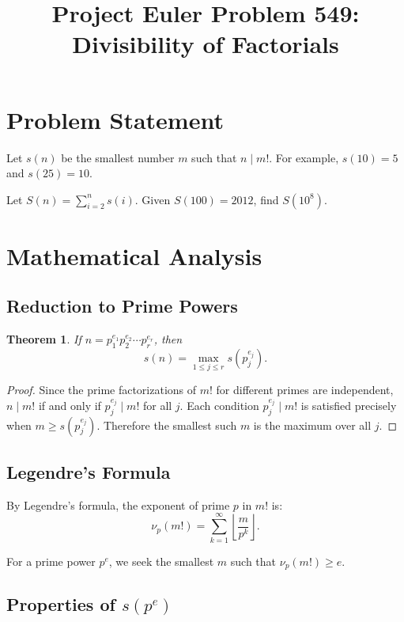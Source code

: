 \documentclass[12pt]{article}
\title{Project Euler Problem 549: Divisibility of Factorials}
\author{}
\date{}
\newtheorem{theorem}{Theorem}
\theoremstyle{definition}
\begin{document}
\maketitle

\section{Problem Statement}

Let $s(n)$ be the smallest number $m$ such that $n \mid m!$. For example, $s(10) = 5$ and $s(25) = 10$.

Let $S(n) = \sum_{i=2}^{n} s(i)$. Given $S(100) = 2012$, find $S(10^8)$.

\section{Mathematical Analysis}

\subsection{Reduction to Prime Powers}

\begin{theorem}
If $n = p_1^{e_1} p_2^{e_2} \cdots p_r^{e_r}$, then
\[
s(n) = \max_{1 \le j \le r} s(p_j^{e_j}).
\]
\end{theorem}

\begin{proof}
Since the prime factorizations of $m!$ for different primes are independent, $n \mid m!$ if and only if $p_j^{e_j} \mid m!$ for all $j$. Each condition $p_j^{e_j} \mid m!$ is satisfied precisely when $m \geq s(p_j^{e_j})$. Therefore the smallest such $m$ is the maximum over all $j$.
\end{proof}

\subsection{Legendre's Formula}

By Legendre's formula, the exponent of prime $p$ in $m!$ is:
\[
\nu_p(m!) = \sum_{k=1}^{\infty} \left\lfloor \frac{m}{p^k} \right\rfloor.
\]

For a prime power $p^e$, we seek the smallest $m$ such that $\nu_p(m!) \geq e$.

\subsection{Properties of $s(p^e)$}
\end{document}
